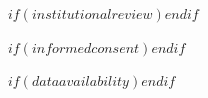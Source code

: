 $if(institutionalreview)$$endif$


$if(informedconsent)$$endif$


$if(dataavailability)$$endif$




